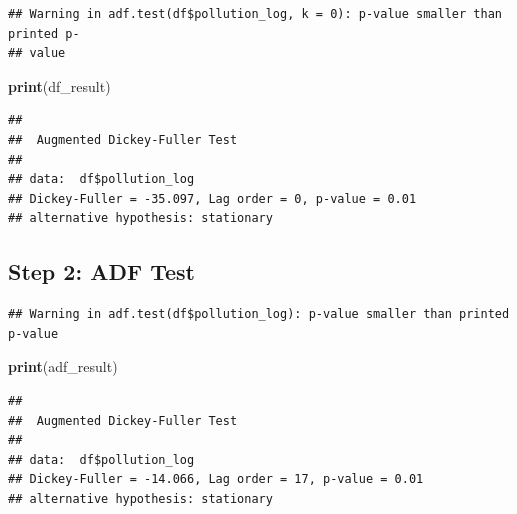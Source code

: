 \documentclass[
]{article}
\newenvironment{Shaded}{\begin{snugshade}}{\end{snugshade}}
\newcommand{\AttributeTok}[1]{\textcolor[rgb]{0.13,0.29,0.53}{#1}}
\newcommand{\DecValTok}[1]{\textcolor[rgb]{0.00,0.00,0.81}{#1}}
\newcommand{\FunctionTok}[1]{\textcolor[rgb]{0.13,0.29,0.53}{\textbf{#1}}}
\newcommand{\NormalTok}[1]{#1}
\newcommand{\OtherTok}[1]{\textcolor[rgb]{0.56,0.35,0.01}{#1}}
\newcommand{\SpecialCharTok}[1]{\textcolor[rgb]{0.81,0.36,0.00}{\textbf{#1}}}
\begin{document}
\begin{Shaded}
\end{Shaded}

\begin{verbatim}
## Warning in adf.test(df$pollution_log, k = 0): p-value smaller than printed p-
## value
\end{verbatim}

\begin{Shaded}
\begin{Highlighting}[]
\FunctionTok{print}\NormalTok{(df\_result)}
\end{Highlighting}
\end{Shaded}

\begin{verbatim}
## 
##  Augmented Dickey-Fuller Test
## 
## data:  df$pollution_log
## Dickey-Fuller = -35.097, Lag order = 0, p-value = 0.01
## alternative hypothesis: stationary
\end{verbatim}

\subsection{Step 2: ADF Test}\label{step-2-adf-test}

\begin{Shaded}
\end{Shaded}

\begin{verbatim}
## Warning in adf.test(df$pollution_log): p-value smaller than printed p-value
\end{verbatim}

\begin{Shaded}
\begin{Highlighting}[]
\FunctionTok{print}\NormalTok{(adf\_result)}
\end{Highlighting}
\end{Shaded}

\begin{verbatim}
## 
##  Augmented Dickey-Fuller Test
## 
## data:  df$pollution_log
## Dickey-Fuller = -14.066, Lag order = 17, p-value = 0.01
## alternative hypothesis: stationary
\end{verbatim}
\end{document}
